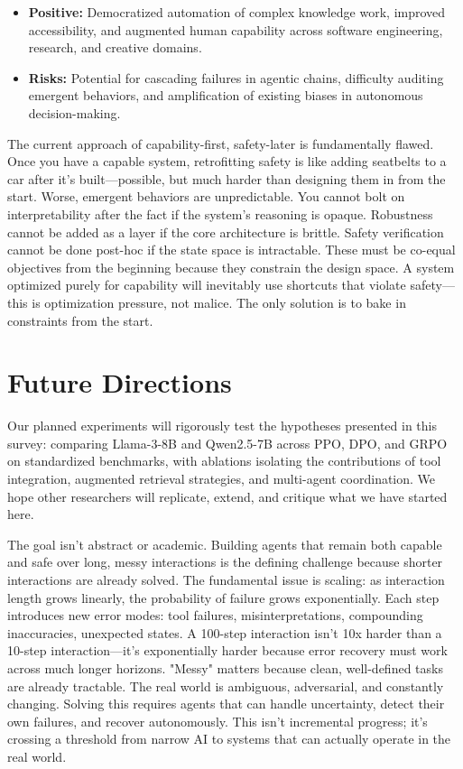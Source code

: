 \documentclass[12pt,a4paper]{report}
\theoremstyle{definition}
\begin{document}
\begin{itemize}
    \item \textbf{Positive:} Democratized automation of complex knowledge work, improved accessibility, and augmented human capability across software engineering, research, and creative domains.
    \item \textbf{Risks:} Potential for cascading failures in agentic chains, difficulty auditing emergent behaviors, and amplification of existing biases in autonomous decision-making.
\end{itemize}

The current approach of capability-first, safety-later is fundamentally flawed. Once you have a capable system, retrofitting safety is like adding seatbelts to a car after it's built—possible, but much harder than designing them in from the start. Worse, emergent behaviors are unpredictable. You cannot bolt on interpretability after the fact if the system's reasoning is opaque. Robustness cannot be added as a layer if the core architecture is brittle. Safety verification cannot be done post-hoc if the state space is intractable. These must be co-equal objectives from the beginning because they constrain the design space. A system optimized purely for capability will inevitably use shortcuts that violate safety—this is optimization pressure, not malice. The only solution is to bake in constraints from the start.

\section*{Future Directions}

Our planned experiments will rigorously test the hypotheses presented in this survey: comparing Llama-3-8B and Qwen2.5-7B across PPO, DPO, and GRPO on standardized benchmarks, with ablations isolating the contributions of tool integration, augmented retrieval strategies, and multi-agent coordination.
 We hope other researchers will replicate, extend, and critique what we have started here.

The goal isn't abstract or academic. Building agents that remain both capable and safe over long, messy interactions is the defining challenge because shorter interactions are already solved. The fundamental issue is scaling: as interaction length grows linearly, the probability of failure grows exponentially. Each step introduces new error modes: tool failures, misinterpretations, compounding inaccuracies, unexpected states. A 100-step interaction isn't 10x harder than a 10-step interaction—it's exponentially harder because error recovery must work across much longer horizons. "Messy" matters because clean, well-defined tasks are already tractable. The real world is ambiguous, adversarial, and constantly changing. Solving this requires agents that can handle uncertainty, detect their own failures, and recover autonomously. This isn't incremental progress; it's crossing a threshold from narrow AI to systems that can actually operate in the real world.
\end{document}
